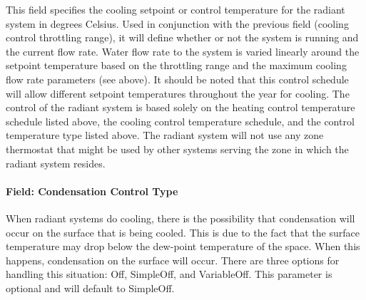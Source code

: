 This field specifies the cooling setpoint or control temperature for the radiant system in degrees Celsius. Used in conjunction with the previous field (cooling control throttling range), it will define whether or not the system is running and the current flow rate. Water flow rate to the system is varied linearly around the setpoint temperature based on the throttling range and the maximum cooling flow rate parameters (see above). It should be noted that this control schedule will allow different setpoint temperatures throughout the year for cooling. The control of the radiant system is based solely on the heating control temperature schedule listed above, the cooling control temperature schedule, and the control temperature type listed above. The radiant system will not use any zone thermostat that might be used by other systems serving the zone in which the radiant system resides.

\paragraph{Field: Condensation Control Type}\label{field-condensation-control-type}

When radiant systems do cooling, there is the possibility that condensation will occur on the surface that is being cooled. This is due to the fact that the surface temperature may drop below the dew-point temperature of the space. When this happens, condensation on the surface will occur. There are three options for handling this situation: Off, SimpleOff, and VariableOff. This parameter is optional and will default to SimpleOff.

